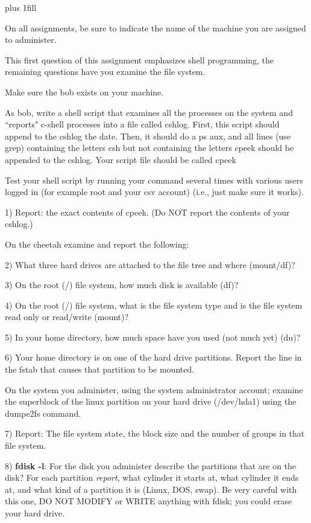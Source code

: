 
\rightskip=0pt plus 1fill

\parindent 0pt

On all assignments, be sure to indicate the name of the
machine you are assigned to administer.

This first question of this assignment emphasizes shell programming,
the remaining questions have you examine the file system.

Make sure the {\ltt{}bob} exists on your 
machine.

As bob, write a shell script that examines all the processes on the
system and ``reports" c-shell processes
into a file called {\ltt{}cshlog}.
First, this script should append to the {\ltt{}cshlog} the {\ltt{}date}.
Then, it should do a {\ltt{}ps aux}, and all lines (use {\ltt{}grep})
containing the letters csh but not containing the letters cpeek
should be appended to the {\ltt{}cshlog}.
Your script file should be called {\ltt{}cpeek}

Test your shell script by
running your command several times with various users logged 
in (for example root and your csv account)
(i.e., just make sure it works).

1) Report: the exact contents of {\ltt{}cpeek}.
(Do NOT report the contents of your cshlog.)

On the {\ltt{}cheetah} examine and report the following:

2) What three hard drives are attached to the file tree and where (mount/df)?

3) On the root ({\ltt{}/}) file system, how much disk is available (df)?

4) On the root ({\ltt{}/}) file system, what is the file system type
and is the file system read only or read/write (mount)?

5) In your home directory, how much space have you used (not much yet) (du)?

6) Your home directory is on one of the hard drive partitions.
Report the line in the {\ltt{}fstab} that causes that partition
to be mounted.

On the system you administer, using the system administrator account;
examine the superblock of the linux partition on your hard drive
({\ltt{}/dev/hda1}) using the {\ltt{}dumpe2fs} command.

7) Report: The file system state, the block size and the number of groups
in that file system.

8) {\bf fdisk -l}:
For the disk you administer describe the partitions that are on the disk?
For each partition {\it report}, what cylinder it starts at,
what cylinder it ends at,
and what kind of a partition it is (Linux, DOS, swap).
Be very careful with this one, 
DO NOT MODIFY or WRITE anything with fdisk; 
you could erase your hard drive.

\bye
